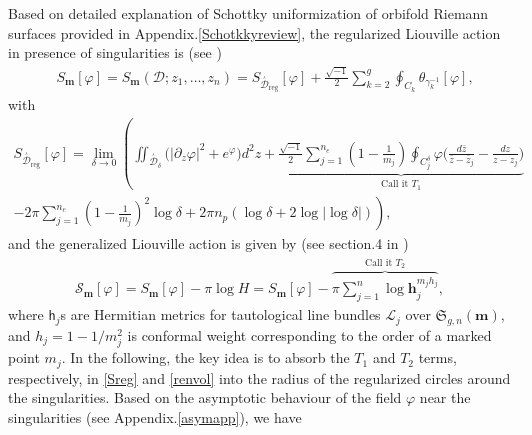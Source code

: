\documentclass[a4paper,11pt]{article}
\newcommand{\schottky}{\mathfrak{S}}
\newcommand{\linebundle}{\mathscr{L}}
\newcommand{\Lponetial}{\mathsf{h}}
\newcommand{\SchottkyFund}{\mathcal{D}}
\newcommand{\singfund}{\overset{{}_{\curlywedge}}{\mathcal{D}}}
\begin{document}
Based on detailed explanation of Schottky uniformization of orbifold Riemann surfaces provided in Appendix.\ref{Schotkkyreview}, the regularized Liouville action in presence of singularities is (see \cite{zograf1988liouville,Takhtajan:2001uj,Taghavi2024classical})
\begin{equation}
\begin{split}
&S_{\boldsymbol{m}}[\varphi] = S_{\boldsymbol{m}}(\SchottkyFund;z_1,\dots,z_{n}) 
= S_{\singfund_{\text{reg}}}[\varphi] + \frac{\sqrt{-1}}{2} \sum_{k=2}^{g} \oint_{C_k} \theta_{\gamma_k^{-1}}[\varphi],
\end{split}\label{regularizeLiouvilleaction}
\end{equation}
with 
\begin{multline}
S_{\singfund_{\text{reg}}}[\varphi] = \lim_{\delta \to 0} \left(\iint_{\singfund_{\delta}} \Big(
|\partial_z \varphi|^2 + e^\varphi
\Big) d^2z + \underbrace{\frac{\sqrt{-1}}{2} \sum_{j=1}^{n_e} (1-\frac{1}{m_j}) \oint_{C_j^{\delta}} \varphi \Big(
\frac{d\bar{z}}{\bar{z} - \bar{z}_j} - \frac{dz}{z-z_j}\Big) }_{\text{
Call it $T_1$}}\right. \\ 
\left. -2\pi \sum_{j=1}^{n_e} (1-\frac{1}{m_j})^2 \log \delta + 2\pi n_p \left(
\log\delta + 2\log \left|\log \delta\right|
\right)\right),
\label{Sreg}
\end{multline}
and the generalized Liouville action is given by (see section.4  in \cite{Taghavi2024classical})
\begin{equation}
\begin{aligned}
\mathscr{S}_{\boldsymbol{m}}[\varphi] = S_{\boldsymbol{m}}[\varphi] - \pi \log H = S_{\boldsymbol{m}}[\varphi] - \overbrace{\pi\sum_{j=1}^{n} \log \mathbf{h}_j^{m_j h_j}}^{\text{Call it $T_2$}},
\end{aligned}
\label{renvol}
\end{equation}
where $\Lponetial_j$s are Hermitian metrics for tautological line bundles $\linebundle_j$ over $\schottky_{g,n}(\boldsymbol{m})$, and $h_j=1-1/m_j^2$ is conformal weight corresponding to the order of a marked point $m_j$. In the following, the key idea is to absorb the $T_1$ and $T_2$ terms, respectively, in \eqref{Sreg} and \eqref{renvol} into the radius of the regularized circles around the singularities. Based on  the asymptotic behaviour of the field $\varphi$ near the  singularities (see Appendix.\ref{asymapp}), we have
\end{document}
